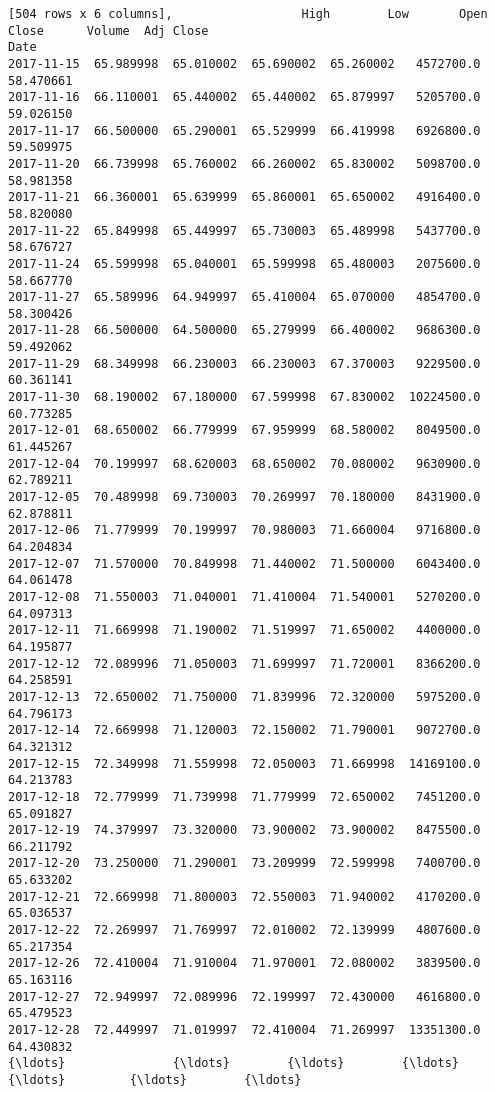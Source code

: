 \documentclass[11pt]{article}
\begin{document}
\begin{Verbatim}[commandchars=\\\{\}]
[504 rows x 6 columns],                  High        Low       Open      Close      Volume  Adj Close
Date                                                                         
2017-11-15  65.989998  65.010002  65.690002  65.260002   4572700.0  58.470661
2017-11-16  66.110001  65.440002  65.440002  65.879997   5205700.0  59.026150
2017-11-17  66.500000  65.290001  65.529999  66.419998   6926800.0  59.509975
2017-11-20  66.739998  65.760002  66.260002  65.830002   5098700.0  58.981358
2017-11-21  66.360001  65.639999  65.860001  65.650002   4916400.0  58.820080
2017-11-22  65.849998  65.449997  65.730003  65.489998   5437700.0  58.676727
2017-11-24  65.599998  65.040001  65.599998  65.480003   2075600.0  58.667770
2017-11-27  65.589996  64.949997  65.410004  65.070000   4854700.0  58.300426
2017-11-28  66.500000  64.500000  65.279999  66.400002   9686300.0  59.492062
2017-11-29  68.349998  66.230003  66.230003  67.370003   9229500.0  60.361141
2017-11-30  68.190002  67.180000  67.599998  67.830002  10224500.0  60.773285
2017-12-01  68.650002  66.779999  67.959999  68.580002   8049500.0  61.445267
2017-12-04  70.199997  68.620003  68.650002  70.080002   9630900.0  62.789211
2017-12-05  70.489998  69.730003  70.269997  70.180000   8431900.0  62.878811
2017-12-06  71.779999  70.199997  70.980003  71.660004   9716800.0  64.204834
2017-12-07  71.570000  70.849998  71.440002  71.500000   6043400.0  64.061478
2017-12-08  71.550003  71.040001  71.410004  71.540001   5270200.0  64.097313
2017-12-11  71.669998  71.190002  71.519997  71.650002   4400000.0  64.195877
2017-12-12  72.089996  71.050003  71.699997  71.720001   8366200.0  64.258591
2017-12-13  72.650002  71.750000  71.839996  72.320000   5975200.0  64.796173
2017-12-14  72.669998  71.120003  72.150002  71.790001   9072700.0  64.321312
2017-12-15  72.349998  71.559998  72.050003  71.669998  14169100.0  64.213783
2017-12-18  72.779999  71.739998  71.779999  72.650002   7451200.0  65.091827
2017-12-19  74.379997  73.320000  73.900002  73.900002   8475500.0  66.211792
2017-12-20  73.250000  71.290001  73.209999  72.599998   7400700.0  65.633202
2017-12-21  72.669998  71.800003  72.550003  71.940002   4170200.0  65.036537
2017-12-22  72.269997  71.769997  72.010002  72.139999   4807600.0  65.217354
2017-12-26  72.410004  71.910004  71.970001  72.080002   3839500.0  65.163116
2017-12-27  72.949997  72.089996  72.199997  72.430000   4616800.0  65.479523
2017-12-28  72.449997  71.019997  72.410004  71.269997  13351300.0  64.430832
{\ldots}               {\ldots}        {\ldots}        {\ldots}        {\ldots}         {\ldots}        {\ldots}

\end{Verbatim}
\end{document}

